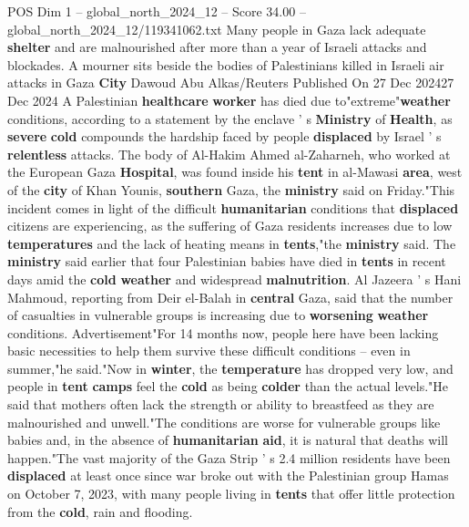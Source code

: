 \begin{textsample}{POS Dim 1 – global\_north\_2024\_12 – Score 34.00 – global\_north\_2024\_12/119341062.txt}  \label{ex:f1_pos_228}
Many people in Gaza lack adequate \textbf{shelter} and are malnourished after more than a year of Israeli attacks and blockades.
A mourner sits beside the bodies of Palestinians killed in Israeli air attacks in Gaza \textbf{City} Dawoud Abu Alkas/Reuters Published On 27 Dec 202427 Dec 2024 A Palestinian \textbf{healthcare} \textbf{worker} has died due to"extreme"\textbf{weather} conditions, according to a statement by the enclave ' s \textbf{Ministry} of \textbf{Health}, as \textbf{severe} \textbf{cold} compounds the hardship faced by people \textbf{displaced} by Israel ' s \textbf{relentless} attacks.
The body of Al-Hakim Ahmed al-Zaharneh, who worked at the European Gaza \textbf{Hospital}, was found inside his \textbf{tent} in al-Mawasi \textbf{area}, west of the \textbf{city} of Khan Younis, \textbf{southern} Gaza, the \textbf{ministry} said on Friday."This incident comes in light of the difficult \textbf{humanitarian} conditions that \textbf{displaced} citizens are experiencing, as the suffering of Gaza residents increases due to low \textbf{temperatures} and the lack of heating means in \textbf{tents},"the \textbf{ministry} said.
The \textbf{ministry} said earlier that four Palestinian babies have died in \textbf{tents} in recent days amid the \textbf{cold} \textbf{weather} and widespread \textbf{malnutrition}.
Al Jazeera ' s Hani Mahmoud, reporting from Deir el-Balah in \textbf{central} Gaza, said that the number of casualties in vulnerable groups is increasing due to \textbf{worsening} \textbf{weather} conditions.
Advertisement"For 14 months now, people here have been lacking basic necessities to help them survive these difficult conditions -- even in summer,"he said."Now in \textbf{winter}, the \textbf{temperature} has dropped very low, and people in \textbf{tent} \textbf{camps} feel the \textbf{cold} as being \textbf{colder} than the actual levels."He said that mothers often lack the strength or ability to breastfeed as they are malnourished and unwell."The conditions are worse for vulnerable groups like babies and, in the absence of \textbf{humanitarian} \textbf{aid}, it is natural that deaths will happen."The vast majority of the Gaza Strip ' s 2.4 million residents have been \textbf{displaced} at least once since war broke out with the Palestinian group Hamas on October 7, 2023, with many people living in \textbf{tents} that offer little protection from the \textbf{cold}, rain and flooding.

\end{textsample}
